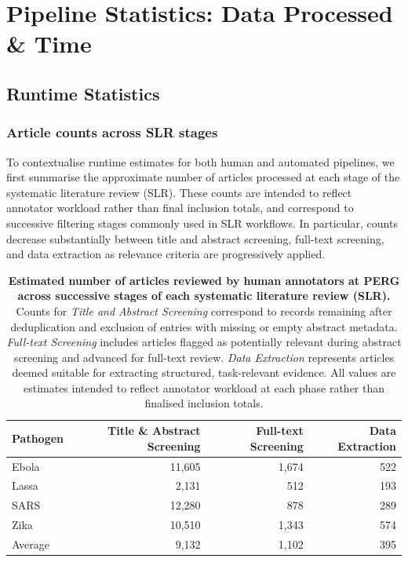 
\clearpage
\section{Pipeline Statistics: Data Processed \& Time}\label{app:pipeline_statistics}

\subsection{Runtime Statistics}
\label{runtime_stats}
\subsubsection*{Article counts across SLR stages}
To contextualise runtime estimates for both human and automated pipelines, we first summarise the approximate number of articles processed at each stage of the systematic literature review (SLR). These counts are intended to reflect annotator workload rather than final inclusion totals, and correspond to successive filtering stages commonly used in SLR workflows. In particular, counts decrease substantially between title and abstract screening, full-text screening, and data extraction as relevance criteria are progressively applied.

\begin{table}[H]
\footnotesize
    \centering
    \caption{
    \textbf{Estimated number of articles reviewed by human annotators at PERG across successive stages of each systematic literature review (SLR).}
    Counts for \emph{Title and Abstract Screening} correspond to records remaining after deduplication and exclusion of entries with missing or empty abstract metadata.
    \emph{Full-text Screening} includes articles flagged as potentially relevant during abstract screening and advanced for full-text review.
    \emph{Data Extraction} represents articles deemed suitable for extracting structured, task-relevant evidence.
    All values are estimates intended to reflect annotator workload at each phase rather than finalised inclusion totals.
    }
    \label{tab:perg_slr_article_counts}
    \begin{tabular}{lrrr}
        \toprule
        \bf Pathogen & \bf Title \& Abstract Screening & \bf Full-text Screening & \bf Data Extraction \\
        \midrule
        Ebola   & 11{,}605 & 1{,}674 & 522 \\
        Lassa   & 2{,}131  & 512     & 193 \\
        SARS    & 12{,}280 & 878     & 289 \\
        Zika    & 10{,}510 & 1{,}343 & 574 \\
        \midrule
        Average & 9{,}132 & 1{,}102 & 395 \\
        \bottomrule
    \end{tabular}
\end{table}


